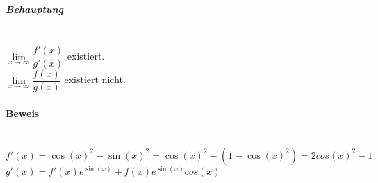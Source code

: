 \documentclass[12pt,a4paper,oneside,ngerman]{article} %
\begin{document}
\subparagraph*{Behauptung} ~\\
\indent $\lim\limits_{x \to \infty} \dfrac{f'(x)}{g'(x)}$ existiert.\\
\indent $\lim\limits_{x \to \infty} \dfrac{f(x)}{g(x)}$ existiert nicht.

\paragraph*{Beweis} ~\\
\indent $ f'(x) = \cos(x)^{2}-\sin(x)^{2} = \cos(x)^{2}-(1-\cos(x)^{2}) = 2 cos(x)^{2} - 1 $ \\
\indent $ g'(x) = f'(x)e^{\sin(x)}+f(x)e^{\sin(x)}cos(x)$ \\




	
\end{document}

